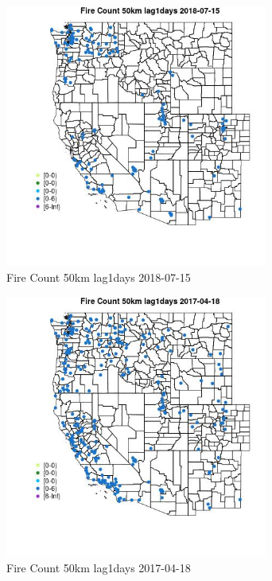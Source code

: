 \begin{figure} 
\centering  
\includegraphics[width=0.77\textwidth]{Code_Outputs/Report_ML_input_PM25_Step4_part_e_de_duplicated_aves_compiled_2019-05-21wNAs_MapObsFire_Count_50km_lag1days2018-07-15.jpg} 
\caption{\label{fig:Report_ML_input_PM25_Step4_part_e_de_duplicated_aves_compiled_2019-05-21wNAsMapObsFire_Count_50km_lag1days2018-07-15}Fire Count 50km lag1days 2018-07-15} 
\end{figure} 
 

\begin{figure} 
\centering  
\includegraphics[width=0.77\textwidth]{Code_Outputs/Report_ML_input_PM25_Step4_part_e_de_duplicated_aves_compiled_2019-05-21wNAs_MapObsFire_Count_50km_lag1days2017-04-18.jpg} 
\caption{\label{fig:Report_ML_input_PM25_Step4_part_e_de_duplicated_aves_compiled_2019-05-21wNAsMapObsFire_Count_50km_lag1days2017-04-18}Fire Count 50km lag1days 2017-04-18} 
\end{figure} 
 

